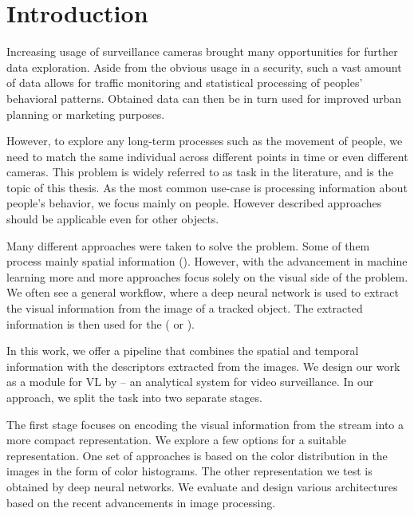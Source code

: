 \chapter*{Introduction}

\label{ch:intro}

Increasing usage of surveillance cameras brought many opportunities for further data exploration. Aside from the obvious usage in a security, such a vast amount of data allows for traffic monitoring and statistical processing of peoples' behavioral patterns. Obtained data can then be in turn used for improved urban planning or marketing purposes.

However, to explore any long-term processes such as the movement of people, we need to match the same individual across different points in time or even different cameras. This problem is widely referred to as \reid{} task in the literature, and is the topic of this thesis. As the most common use-case is processing information about people's behavior, we focus mainly on people. However described approaches should be applicable even for other objects.

Many different approaches were taken to solve the \reid{} problem. Some of them process mainly spatial information (\cite{hu2006principal}). However, with the advancement in machine learning more and more approaches focus solely on the visual side of the problem. We often see a general workflow, where a deep neural network is used to extract the visual information from the image of a tracked object. The extracted information is then used for the \reid{} (\cite{ding2015deep} or \cite{cheng2016person}).

In this work, we offer a \reid{} pipeline that combines the spatial and temporal information with the descriptors extracted from the images. We design our work as a module for \gls{VL} by \cite{videolytics} -- an analytical system for video surveillance. In our approach, we split the task into two separate stages.

The first stage focuses on encoding the visual information from the stream into a more compact representation. We explore a few options for a suitable representation. One set of approaches is based on the color distribution in the images in the form of color histograms. The other representation we test is obtained by deep neural networks. We evaluate and design various architectures based on the recent advancements in image processing.

